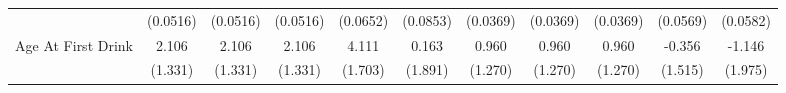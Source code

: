 {\begin{tabular}{l*{10}{c}}
            &    (0.0516)         &    (0.0516)         &    (0.0516)         &    (0.0652)         &    (0.0853)         &    (0.0369)         &    (0.0369)         &    (0.0369)         &    (0.0569)         &    (0.0582)         \\
\addlinespace
Age At First Drink&       2.106         &       2.106         &       2.106         &       4.111\sym{*}  &       0.163         &       0.960         &       0.960         &       0.960         &      -0.356         &      -1.146         \\
            &     (1.331)         &     (1.331)         &     (1.331)         &     (1.703)         &     (1.891)         &     (1.270)         &     (1.270)         &     (1.270)         &     (1.515)         &     (1.975)         \\
\bottomrule
\end{tabular}
}
